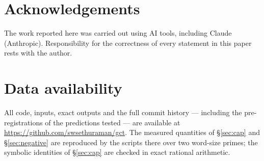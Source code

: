 \documentclass[11pt]{amsart}
\theoremstyle{plain}
\theoremstyle{definition}
\theoremstyle{remark}
\begin{document}
\section*{Acknowledgements}

The work reported here was carried out using AI tools, including Claude (Anthropic).
Responsibility for the correctness of every statement in this paper rests with
the author.

\section*{Data availability}\label{sec:data}

All code, inputs, exact outputs and the full commit history --- including the
pre-registrations of the predictions tested --- are available at
\url{https://github.com/swsethuraman/gct}.  The measured quantities of
\S\ref{sec:cap} and \S\ref{sec:negative} are reproduced by the scripts there
over two word-size primes; the symbolic identities of \S\ref{sec:cap} are
checked in exact rational arithmetic.
\end{document}
